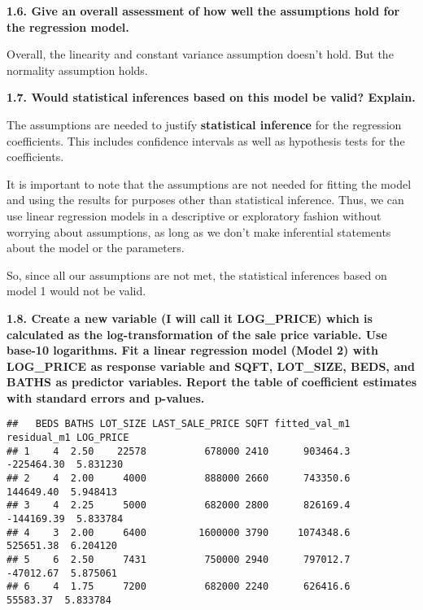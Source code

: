 \documentclass[
]{article}
\newenvironment{Shaded}{\begin{snugshade}}{\end{snugshade}}
\newcommand{\FunctionTok}[1]{\textcolor[rgb]{0.00,0.00,0.00}{#1}}
\newcommand{\NormalTok}[1]{#1}
\newcommand{\OtherTok}[1]{\textcolor[rgb]{0.56,0.35,0.01}{#1}}
\newcommand{\SpecialCharTok}[1]{\textcolor[rgb]{0.00,0.00,0.00}{#1}}
\begin{document}
\textbf{1.6. Give an overall assessment of how well the assumptions hold
for the regression model.}

Overall, the linearity and constant variance assumption doesn't hold.
But the normality assumption holds.

\textbf{1.7. Would statistical inferences based on this model be valid?
Explain.}

The assumptions are needed to justify \textbf{statistical inference} for
the regression coefficients. This includes confidence intervals as well
as hypothesis tests for the coefficients.

It is important to note that the assumptions are not needed for fitting
the model and using the results for purposes other than statistical
inference. Thus, we can use linear regression models in a descriptive or
exploratory fashion without worrying about assumptions, as long as we
don't make inferential statements about the model or the parameters.

So, since all our assumptions are not met, the statistical inferences
based on model 1 would not be valid.

\textbf{1.8. Create a new variable (I will call it LOG\_PRICE) which is
calculated as the log-transformation of the sale price variable. Use
base-10 logarithms. Fit a linear regression model (Model 2) with
LOG\_PRICE as response variable and SQFT, LOT\_SIZE, BEDS, and BATHS as
predictor variables. Report the table of coefficient estimates with
standard errors and p-values.}

\begin{Shaded}
\end{Shaded}

\begin{verbatim}
##   BEDS BATHS LOT_SIZE LAST_SALE_PRICE SQFT fitted_val_m1 residual_m1 LOG_PRICE
## 1    4  2.50    22578          678000 2410      903464.3  -225464.30  5.831230
## 2    4  2.00     4000          888000 2660      743350.6   144649.40  5.948413
## 3    4  2.25     5000          682000 2800      826169.4  -144169.39  5.833784
## 4    3  2.00     6400         1600000 3790     1074348.6   525651.38  6.204120
## 5    6  2.50     7431          750000 2940      797012.7   -47012.67  5.875061
## 6    4  1.75     7200          682000 2240      626416.6    55583.37  5.833784
\end{verbatim}
\end{document}

